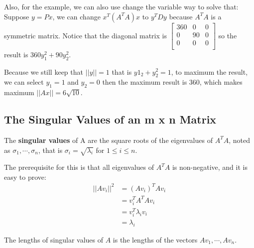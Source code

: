 \begin{remark}
    Also, for the example, we can also use change the variable way to solve that:
    Suppose \(y = Px\), we can change \(x^T(A^TA)x\)  to \(y^TDy\) because \(A^TA\) is a symmetric matrix.  
    Notice that the diagonal matrix is \(\begin{bmatrix}
        360 & 0 &  0 \\
        0 & 90 &  0 \\
        0 & 0 &  0 \\
    \end{bmatrix}\) so the result is \(360y_1^2 + 90y_2^2\). 

    Because we still keep that \(||y|| = 1\) that is \(y1_2 + y_2^2 = 1\), to maximum the result, we can select \(y_1 = 1\) and \(y_2 = 0\) then the maximum result is 360, which makes maximum \(||Ax|| = 6\sqrt{10}\).    
\end{remark}

\subsection{The Singular Values of an m x n Matrix}

\begin{definition}
    The \textbf{singular values}  of A are the square roots of the eigenvalues of \(A^TA\), noted as \(\sigma_1, \cdots ,\sigma_n\), that is \(\sigma_i = \sqrt{\lambda_i}\) for \(1 \leq i \leq n\). 

    \begin{remark}
        The prerequisite for this is that all eigenvalues of \(A^TA\) is non-negative, and it is easy to prove:
            \begin{align*}
                ||Av_i||^2 & = (Av_i)^TAv_i \\
                    & = v_i^T A^TA v_i \\
                    & = v_i^T \lambda_i v_i \tag{\(\lambda_i\) is the eigenvalue of \(A^TA\) }\\ 
                    & = \lambda_i \tag{\(v_i\) is unit vector }
            \end{align*}
        
    \end{remark}

    \begin{remark}
        The lengths of singular values of \(A\) is the lengths of the vectors \(Av_1, \cdots, Av_n\). 
    \end{remark}
\end{definition}

